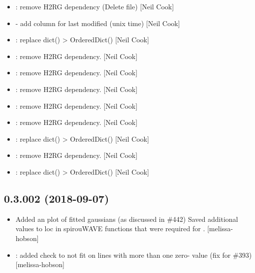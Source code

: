 \documentclass[a4paper,10pt,english]{report}
\begin{document}
\begin{itemize}
\item {} 
: remove H2RG dependency (Delete file) {[}Neil
Cook{]}

\item {} 
 - add column for last modified (unix time)
{[}Neil Cook{]}

\item {} 
: replace dict() \textendash{}\textgreater{} OrderedDict() {[}Neil Cook{]}

\item {} 
: remove H2RG dependency. {[}Neil Cook{]}

\item {} 
: remove H2RG dependency. {[}Neil Cook{]}

\item {} 
: remove H2RG dependency. {[}Neil Cook{]}

\item {} 
: remove H2RG dependency. {[}Neil Cook{]}

\item {} 
: remove H2RG dependency. {[}Neil Cook{]}

\item {} 
: replace dict() \textendash{}\textgreater{} OrderedDict() {[}Neil Cook{]}

\item {} 
: remove H2RG dependency. {[}Neil Cook{]}

\item {} 
: replace dict() \textendash{}\textgreater{} OrderedDict() {[}Neil Cook{]}

\end{itemize}


\subsection{0.3.002 (2018-09-07)}
\label{\detokenize{misc/changelog:id333}}\begin{itemize}
\item {} 
Added an  plot of fitted gaussians (as discussed in \#442)
Saved additional values to loc in spirouWAVE functions that were
required for . {[}melissa-hobson{]}

\item {} 
: added check to not fit on lines with more than one zero-
value (fix for \#393) {[}melissa-hobson{]}

\end{itemize}
\end{document}
